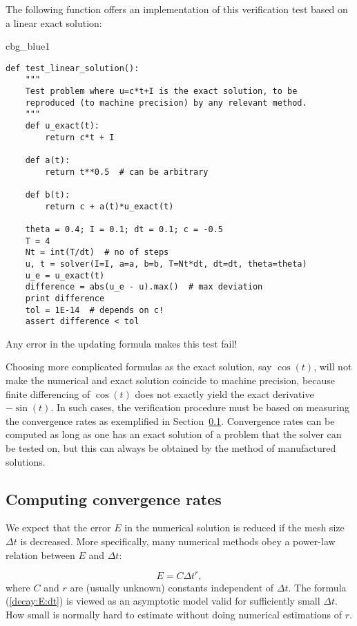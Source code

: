 \documentclass[graybox,sectrefs,envcountresetchap,open=right,final]{svmonodo}
\newenvironment{_cod_tight}[1]{
   \def\FrameCommand{\colorbox{#1}}
   \FrameRule0.6pt\MakeFramed {\FrameRestore}\vskip3mm}
   {\vskip0mm\endMakeFramed}
\newenvironment{cod}[1]{
\bgroup\rmfamily
\fboxsep=0mm\relax
\begin{_cod_tight}{#1}
\list{}{\parsep=-2mm\parskip=0mm\topsep=0pt\leftmargin=2mm
\rightmargin=2\leftmargin\leftmargin=4pt\relax}
\item\relax}
{\endlist\end{_cod_tight}\egroup}
\begin{document}
The following function offers an implementation of this verification
test based on a linear exact solution:

\begin{cod}{cbg_blue1}\begin{Verbatim}[numbers=none,fontsize=\fontsize{9pt}{9pt},baselinestretch=0.95,xleftmargin=2mm]
def test_linear_solution():
    """
    Test problem where u=c*t+I is the exact solution, to be
    reproduced (to machine precision) by any relevant method.
    """
    def u_exact(t):
        return c*t + I

    def a(t):
        return t**0.5  # can be arbitrary

    def b(t):
        return c + a(t)*u_exact(t)

    theta = 0.4; I = 0.1; dt = 0.1; c = -0.5
    T = 4
    Nt = int(T/dt)  # no of steps
    u, t = solver(I=I, a=a, b=b, T=Nt*dt, dt=dt, theta=theta)
    u_e = u_exact(t)
    difference = abs(u_e - u).max()  # max deviation
    print difference
    tol = 1E-14  # depends on c!
    assert difference < tol
\end{Verbatim}
\end{cod}
\noindent
Any error in the updating formula makes this test fail!

Choosing more complicated formulas as the exact solution, say
$\cos(t)$, will not make the numerical and exact solution
coincide to machine precision, because finite differencing of
$\cos(t)$ does not exactly yield the exact derivative $-\sin(t)$.
In such cases, the verification procedure
must be based on measuring the convergence rates as exemplified in
Section~\ref{decay:convergence:rate}. Convergence rates can be
computed as long as one has
an exact solution of a problem that the solver can be tested on, but
this can always be obtained by the method of manufactured solutions.


\subsection{Computing convergence rates}
\label{decay:convergence:rate}


We expect that the error $E$ in the numerical solution is
reduced if the mesh size $\Delta t$ is decreased. More specifically,
many numerical methods obey a power-law relation between $E$ and
$\Delta t$:

\begin{equation}
E = C\Delta t^r,
\label{decay:E:dt}
\end{equation}
where $C$ and $r$ are (usually unknown) constants independent of $\Delta t$.
The formula (\ref{decay:E:dt}) is viewed as an asymptotic model valid for
sufficiently small $\Delta t$. How small is normally hard to estimate
without doing numerical estimations of $r$.
\end{document}
